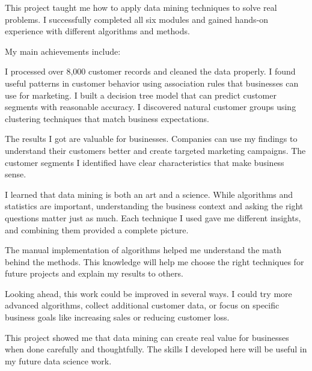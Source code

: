 \documentclass[12pt,a4paper]{article}
\begin{document}
This project taught me how to apply data mining techniques to solve real problems. I successfully completed all six modules and gained hands-on experience with different algorithms and methods.

My main achievements include:

I processed over 8,000 customer records and cleaned the data properly. I found useful patterns in customer behavior using association rules that businesses can use for marketing. I built a decision tree model that can predict customer segments with reasonable accuracy. I discovered natural customer groups using clustering techniques that match business expectations.

The results I got are valuable for businesses. Companies can use my findings to understand their customers better and create targeted marketing campaigns. The customer segments I identified have clear characteristics that make business sense.

I learned that data mining is both an art and a science. While algorithms and statistics are important, understanding the business context and asking the right questions matter just as much. Each technique I used gave me different insights, and combining them provided a complete picture.

The manual implementation of algorithms helped me understand the math behind the methods. This knowledge will help me choose the right techniques for future projects and explain my results to others.

Looking ahead, this work could be improved in several ways. I could try more advanced algorithms, collect additional customer data, or focus on specific business goals like increasing sales or reducing customer loss.

This project showed me that data mining can create real value for businesses when done carefully and thoughtfully. The skills I developed here will be useful in my future data science work.
\end{document}
